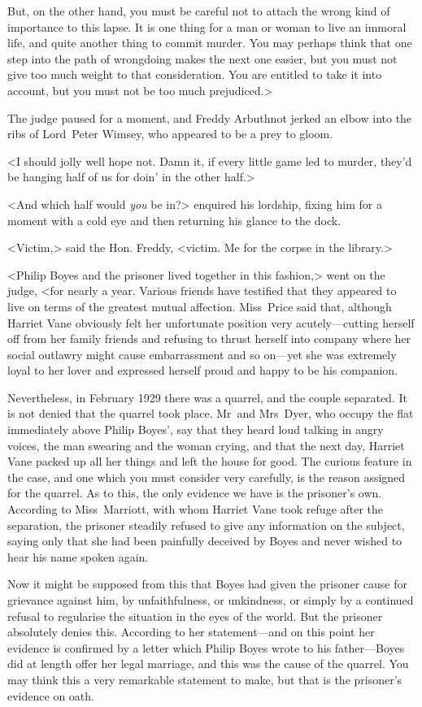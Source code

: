 But, on the other hand, you must be careful not to attach the wrong kind of importance to this lapse. It is one thing for a man or woman to live an immoral life, and quite another thing to commit murder. You may perhaps think that one step into the path of wrongdoing makes the next one easier, but you must not give too much weight to that consideration. You are entitled to take it into account, but you must not be too much prejudiced.>

The judge paused for a moment, and Freddy Arbuthnot jerked an elbow into the ribs of Lord~Peter Wimsey, who appeared to be a prey to gloom.

<I should jolly well hope not. Damn it, if every little game led to murder, they'd be hanging half of us for doin' in the other half.>

<And which half would \emph{you} be in?> enquired his lordship, fixing him for a moment with a cold eye and then returning his glance to the dock.

<Victim,> said the Hon. Freddy, <victim. Me for the corpse in the library.>

<Philip Boyes and the prisoner lived together in this fashion,> went on the judge, <for nearly a year. Various friends have testified that they appeared to live on terms of the greatest mutual affection. Miss~Price said that, although Harriet Vane obviously felt her unfortunate position very acutely—cutting herself off from her family friends and refusing to thrust herself into company where her social outlawry might cause embarrassment and so on—yet she was extremely loyal to her lover and expressed herself proud and happy to be his companion.

Nevertheless, in February 1929 there was a quarrel, and the couple separated. It is not denied that the quarrel took place. Mr~and Mrs~Dyer, who occupy the flat immediately above Philip Boyes', say that they heard loud talking in angry voices, the man swearing and the woman crying, and that the next day, Harriet Vane packed up all her things and left the house for good. The curious feature in the case, and one which you must consider very carefully, is the reason assigned for the quarrel. As to this, the only evidence we have is the prisoner's own. According to Miss~Marriott, with whom Harriet Vane took refuge after the separation, the prisoner steadily refused to give any information on the subject, saying only that she had been painfully deceived by Boyes and never wished to hear his name spoken again.

Now it might be supposed from this that Boyes had given the prisoner cause for grievance against him, by unfaithfulness, or unkindness, or simply by a continued refusal to regularise the situation in the eyes of the world. But the prisoner absolutely denies this. According to her statement—and on this point her evidence is confirmed by a letter which Philip Boyes wrote to his father—Boyes did at length offer her legal marriage, and this was the cause of the quarrel. You may think this a very remarkable statement to make, but that is the prisoner's evidence on oath.

